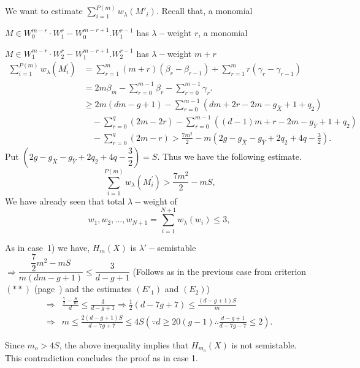 {\noindent
We want to estimate $\sum\limits^{P(m)}_{i = 1} w_{\lambda
}(M'_{i})$. Recall that, a monomial 

$ M \in W^{m-r}_{0} \cdot W^r_1 - W^{m-r+1}_{0}. W^{r-1}_{1}$
has $\lambda-$weight $r$, a monomial 
 
 $M \in W^{m-r}_1 \cdot W^{r}_2 - W^{m-r+1}_{1} . W^{r-1}_{2}$
has $\lambda-$weight $m + r$  
{\fontsize{10}{12}\selectfont
\begin{align*}
\sum_{i = 1}^{P(m)} w_{\lambda} (M^{'}_{i}) & = \sum^{m}_{r=1} (m + r)
(\beta_r - \beta_{r-1}) + \sum^{m}_{r=1} r(\gamma_r - \gamma_{r-1})\\ 
& = 2m\beta_m - \sum^{m-1}_{r=0} \beta_r - \sum^{m-1}_{r=0}
\gamma_r.\\ 
& \ge 2m (dm - g+1) - \sum^{m-1}_{r=0} (dm + 2r-2m-g_{\bar{X}} + 1 +q_2
)\\ 
&\quad - \sum^{q}_{r=0} (2m - 2r) 
 - \sum^{m-1}_{r=0} ((d-1)m+r-2m - g_{\bar{Y}} + 1 +q_2)\\ 
&\quad - \sum^{q}_{r=0} (2m -r) 
 > \frac{7m^2}{2}-m (2g - g_{\bar{X}}-g_{\bar{Y}} + 2q_2 + 4q -
\frac{3}{2}). 
\end{align*}}\relax\pageoriginale
Put $(2g - g_{\bar{X}} - g_{\bar{Y}} + 2q_2 + 4q -
\dfrac{3}{2})=S$. Thus we have the following estimate. 
\begin{equation*}
\sum^{P(m)}_{i =1} w_{\lambda}(M^{'}_{i}) > \frac{7m^{2}}{2} - mS, \tag*{$(E'_1)$}
\end{equation*}
We have already seen that total $\lambda-$weight of 
\begin{equation*}
w_1, w_2, \ldots, w_{N+1} = \sum^{N+1}_{i=1} w_{\lambda}(w_i) \le 3, \tag*{$(E_2)$}
\end{equation*}

\noindent
As in case~1) we have, $H_m(X)$ is $\lambda'-$semistable
$\Longrightarrow \dfrac{\dfrac{7}{2}m^2 - mS}{m(dm-g+1)} \leq
\dfrac{3}{d-g+1}$ (Follows as in the previous case from 
criterion~$(**)$ (page~\pageref{page10}) and the estimates 
$(E'_{1})$ and $(E_2)$) 
\begin{align*}
\Longrightarrow & \frac{\frac{7}{2}- \frac{S}{m}}{d} \le
\frac{3}{d-g+1} \Longrightarrow \frac{1}{2}(d-7g +7) \le
\frac{(d-g+1)S}{m}\\ 
\Longrightarrow & m \le \frac{2(d-g+1)S}{d - 7g +7} \le 4S (\because d
\ge 20 (g-1) \therefore \frac{d-g+1}{d-7g-7} \le 2). 
\end{align*} 
 
Since $m_o > 4S$, the above inequality implies that $H_{m_o} (X)$ is
not semistable. This contradiction concludes the proof as in case
1. 

}
